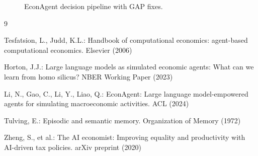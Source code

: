 \documentclass[runningheads]{llncs}
\begin{document}
\begin{figure}[t]
\centering
{}
\caption{EconAgent decision pipeline with GAP fixes.}
\label{fig:framework}
\end{figure}


\begin{thebibliography}{9}

Tesfatsion, L., Judd, K.L.: Handbook of computational economics: agent-based computational economics. Elsevier (2006)

Horton, J.J.: Large language models as simulated economic agents: What can we learn from homo silicus? NBER Working Paper (2023)

Li, N., Gao, C., Li, Y., Liao, Q.: EconAgent: Large language model-empowered agents for simulating macroeconomic activities. ACL (2024)

Tulving, E.: Episodic and semantic memory. Organization of Memory (1972)

Zheng, S., et al.: The AI economist: Improving equality and productivity with AI-driven tax policies. arXiv preprint (2020)

\end{thebibliography}
\end{document}
